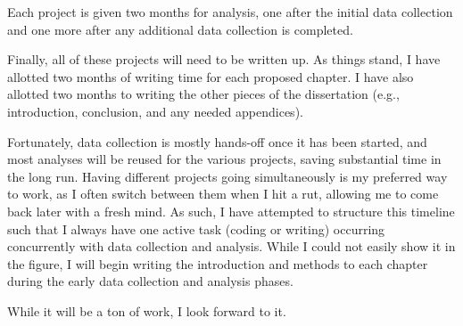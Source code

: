 Each project is given two months for analysis, one after the initial data collection and one more after any additional data collection is completed. 

Finally, all of these projects will need to be written up. %
As things stand, I have allotted two months of writing time for each proposed chapter. 
I have also allotted two months to writing the other pieces of the dissertation (e.g., introduction, conclusion, and any needed appendices). 

Fortunately, data collection is mostly hands-off once it has been started, and most analyses will be reused for the various projects, saving substantial time in the long run. 
Having different projects going simultaneously is my preferred way to work, as I often switch between them when I hit a rut, allowing me to come back later with a fresh mind. 
As such, I have attempted to structure this timeline such that I always have one active task (coding or writing) occurring concurrently with data collection and analysis. 
While I could not easily show it in the figure, I will begin writing the introduction and methods to each chapter during the early data collection and analysis phases. 

While it will be a ton of work, I look forward to it. 



